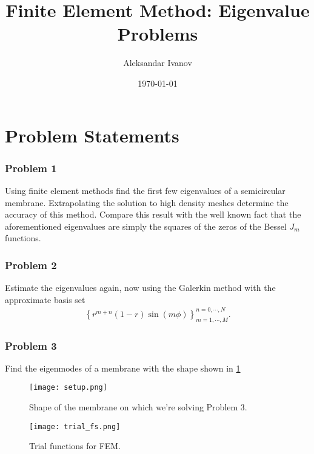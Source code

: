 \documentclass[10pt,a4paper,twocolumn]{article}
\begin{document}
\title{Finite Element Method: Eigenvalue Problems}
\author{Aleksandar Ivanov}
\date{\today}
\maketitle

\section{Problem Statements}

\subsubsection*{Problem 1}

Using finite element methods find the first few eigenvalues of a semicircular membrane. Extrapolating the solution to high density meshes determine the accuracy of this method. Compare this result with the well known fact that the aforementioned eigenvalues are simply the squares of the zeros of the Bessel $J_m$ functions.

\subsubsection*{Problem 2}

Estimate the eigenvalues again, now using the Galerkin method with the approximate basis set
%
\begin{align}
    \left\{ r^{m+n} (1 - r) \sin(m \phi) \right\}_{m=1, \cdots, M}^{n=0, \cdots, N}.
\end{align}

\subsubsection*{Problem 3}

Find the eigenmodes of a membrane with the shape shown in \cref{fig:Fsetup}

\begin{figure}[!h]
    \centering
    \texttt{[image: setup.png]}
    \caption{Shape of the membrane on which we're solving Problem 3.}
    \label{fig:Fsetup}
\end{figure}


\begin{figure}[!t]
    \centering
    \texttt{[image: trial\_fs.png]}
    \caption{Trial functions for FEM.}
    \label{fig:trial_fs}
\end{figure}
\end{document}
